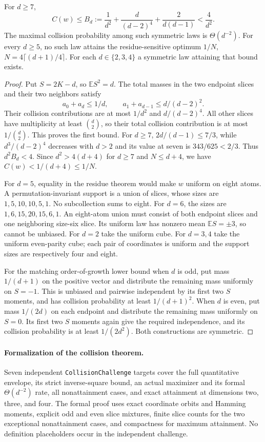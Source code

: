 \begin{theorem}
\label{s12:thm:symmetry-collision}
For $d\ge7$,
\[
 C(w)\le B_d:=\frac1{d^2}+\frac d{(d-2)^4}
                    +\frac2{d(d-1)}<\frac4{d^2}.
\]
The maximal collision probability among such symmetric laws is
$\Theta(d^{-2})$. For every $d\ge5$, no such law attains the
residue-sensitive optimum
$1/N$, $N=4\lceil(d+1)/4\rceil$.
For each $d\in\{2,3,4\}$ a symmetric law attaining that bound exists.
\end{theorem}
\begin{proof}
Put $S=2K-d$, so $\mathbb E S^2=d$. The total masses in the two
endpoint slices and their two neighbors satisfy
\[
 a_0+a_d\le1/d,\qquad a_1+a_{d-1}\le d/(d-2)^2.
\]
Their collision contributions are at most $1/d^2$ and
$d/(d-2)^4$. All other slices have multiplicity at least
$\binom d2$, so their total collision contribution is at most
$1/\binom d2$. This proves the first bound. For $d\ge7$,
$2d/(d-1)\le7/3$, while $d^3/(d-2)^4$ decreases with $d>2$
and its value at seven is $343/625<2/3$. Thus $d^2B_d<4$.
Since $d^2>4(d+4)$ for $d\ge7$ and $N\le d+4$, we have
$C(w)<1/(d+4)\le1/N$.

For $d=5$, equality in the residue theorem would make $w$ uniform
on eight atoms. A permutation-invariant support is a union of slices,
whose sizes are $1,5,10,10,5,1$. No subcollection sums to eight.
For $d=6$, the sizes are $1,6,15,20,15,6,1$. An eight-atom union must
consist of both endpoint slices and one neighboring size-six slice.
Its uniform law has nonzero mean $\mathbb E S=\pm3$, so cannot be
unbiased. For $d=2$ take the uniform cube. For $d=3,4$ take the uniform
even-parity cube; each pair of coordinates is uniform and the support
sizes are respectively four and eight.

For the matching order-of-growth lower bound when $d$ is odd, put
mass $1/(d+1)$ on the positive vector and distribute the remaining
mass uniformly on $S=-1$. This is unbiased and pairwise independent
by its first two $S$ moments, and has collision probability at least
$1/(d+1)^2$. When $d$ is even, put mass $1/(2d)$ on each endpoint
and distribute the remaining mass uniformly on $S=0$. Its first two
$S$ moments again give the required independence, and its collision
probability is at least $1/(2d^2)$. Both constructions are symmetric.
\end{proof}

\paragraph{Formalization of the collision theorem.}
Seven independent \texttt{CollisionChallenge} targets cover the full
quantitative envelope, its strict inverse-square bound, an actual
maximizer and its formal $\Theta(d^{-2})$ rate, all nonattainment cases,
and exact attainment at dimensions two, three, and four.
The formal proof uses exact coordinate orbits and Hamming moments,
explicit odd and even slice mixtures, finite slice counts for the two
exceptional nonattainment cases, and compactness for maximum attainment.
No definition placeholders occur in the independent challenge.

